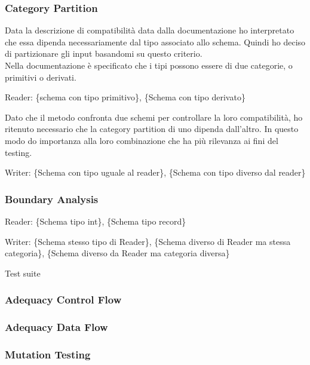 \documentclass[12pt, a4paper]{article}
\begin{document}
\subsubsection{Category Partition}


Data la descrizione di compatibilità data dalla documentazione ho interpretato che essa dipenda necessariamente dal tipo 
associato allo schema. Quindi ho deciso di partizionare gli input basandomi su questo criterio. \\

Nella documentazione è specificato che i tipi possono essere di due categorie, o primitivi o derivati.

Reader: \{schema con tipo primitivo\}, \{Schema con tipo derivato\}

Dato che il metodo confronta due schemi per controllare la loro compatibilità, ho ritenuto necessario che la category partition
di uno dipenda dall'altro. In questo modo do importanza alla loro combinazione che ha più rilevanza ai fini del testing.

Writer: \{Schema con tipo uguale al reader\}, \{Schema con tipo diverso dal reader\}


\subsubsection{Boundary Analysis}

Reader: \{Schema tipo int\}, \{Schema tipo record\}

Writer: \{Schema stesso tipo di Reader\}, \{Schema diverso di Reader ma stessa categoria\}, \{Schema diverso da Reader ma categoria diversa\}
  
Test suite


\subsubsection{Adequacy Control Flow}

\subsubsection{Adequacy Data Flow}

\subsubsection{Mutation Testing}


\end{document}
